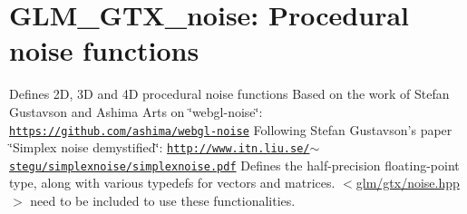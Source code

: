 \hypertarget{group__gtx__noise}{\section{\-G\-L\-M\-\_\-\-G\-T\-X\-\_\-noise\-: \-Procedural noise functions}
\label{group__gtx__noise}
}
\-Defines 2\-D, 3\-D and 4\-D procedural noise functions \-Based on the work of \-Stefan \-Gustavson and \-Ashima \-Arts on \char`\"{}webgl-\/noise\char`\"{}\-: \href{https://github.com/ashima/webgl-noise}{\tt https\-://github.\-com/ashima/webgl-\/noise} \-Following \-Stefan \-Gustavson's paper \char`\"{}\-Simplex noise demystified\char`\"{}\-: \href{http://www.itn.liu.se/~stegu/simplexnoise/simplexnoise.pdf}{\tt http\-://www.\-itn.\-liu.\-se/$\sim$stegu/simplexnoise/simplexnoise.\-pdf} \-Defines the half-\/precision floating-\/point type, along with various typedefs for vectors and matrices. $<$\hyperlink{gtx_2noise_8hpp}{glm/gtx/noise.\-hpp}$>$ need to be included to use these functionalities. 